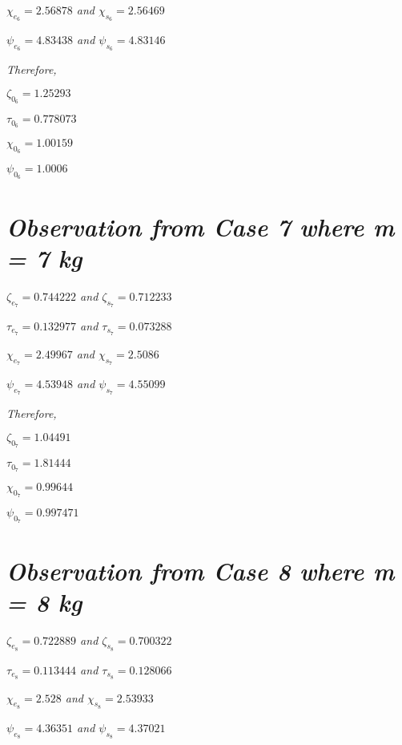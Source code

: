     \textit{$\chi_{e_6} = 2.56878$ and $\chi_{s_6} = 2.56469$}
            
    \textit{$\psi_{e_6} = 4.83438$ and $\psi_{s_6} = 4.83146$}
            
    \textit{Therefore,}
            
    $\zeta_{0_6} = 1.25293$
            
    $\tau_{0_6} = 0.778073$
            
    $\chi_{0_6} = 1.00159$
            
    $\psi_{0_6} = 1.0006$    
            
        
        
\section{\textit{Observation from Case 7 where m = 7 kg}}
        
    \textit{$\zeta_{e_7} = 0.744222$ and $\zeta_{s_7} = 0.712233$}
            
    \textit{$\tau_{e_7} = 0.132977$ and $\tau_{s_7} = 0.073288$}
            
    \textit{$\chi_{e_7} = 2.49967$ and $\chi_{s_7} = 2.5086$}
            
    \textit{$\psi_{e_7} = 4.53948$ and $\psi_{s_7} = 4.55099$}
            
    \textit{Therefore,}
            
    $\zeta_{0_7} = 1.04491$
            
    $\tau_{0_7} = 1.81444$
            
    $\chi_{0_7} = 0.99644$
            
    $\psi_{0_7} = 0.997471$    
            
        
        
\section{\textit{Observation from Case 8 where m = 8 kg}}
        
    \textit{$\zeta_{e_8} = 0.722889$ and $\zeta_{s_8} = 0.700322$}
            
    \textit{$\tau_{e_8} = 0.113444$ and $\tau_{s_8} = 0.128066$}
            
    \textit{$\chi_{e_8} = 2.528$ and $\chi_{s_8} = 2.53933$}
            
    \textit{$\psi_{e_8} = 4.36351$ and $\psi_{s_8} = 4.37021$}
            
